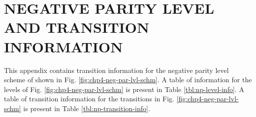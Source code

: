 %
%

\chapter{NEGATIVE PARITY LEVEL AND TRANSITION INFORMATION}
\label{app:neg-par-info}
This appendix contains transition information for the negative parity level scheme of \pr{} shown in Fig. \ref{fig:chp4-neg-par-lvl-schm}. A table of information for the levels of Fig. \ref{fig:chp4-neg-par-lvl-schm} is present in Table \ref{tbl:np-level-info}. A table of transition information for the transitions in Fig. \ref{fig:chp4-neg-par-lvl-schm} is present in Table \ref{tbl:np-transition-info}.

